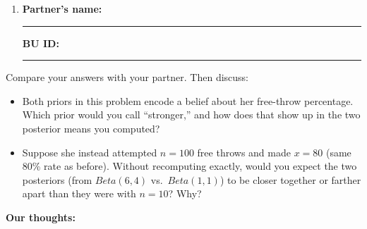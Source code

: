 \documentclass{article}
\newcommand{\nameblank}{\rule{1.75in}{0.4pt}}
\newcommand{\idblank}{\rule{1.55in}{0.4pt}}
\begin{document}
\begin{enumerate}[label=\arabic*.,leftmargin=*,itemsep=.7em, start=2]
  \item \textbf{Partner's name:} \nameblank \hfill \textbf{BU ID:} \idblank
\end{enumerate}

Compare your answers with your partner. Then discuss:

\begin{itemize}
  \item Both priors in this problem encode a belief about her free-throw percentage. Which prior would you call ``stronger,'' and how does that show up in the two posterior means you computed?
  \item Suppose she instead attempted $n=100$ free throws and made $x=80$ (same 80\% rate as before). Without recomputing exactly, would you expect the two posteriors (from $Beta(6,4)$ vs.\ $Beta(1,1)$) to be closer together or farther apart than they were with $n=10$? Why?
\end{itemize}

\textbf{Our thoughts:}
\vfill
\end{document}

